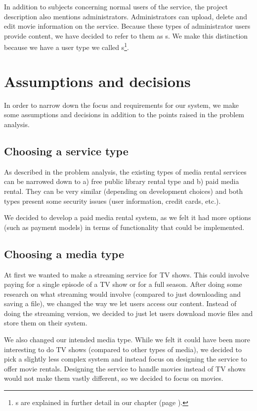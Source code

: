In addition to subjects concerning normal users of the service, the project description also mentions administrators. Administrators can upload, delete and edit movie information on the service. Because these types of administrator users provide content, we have decided to refer to them as s. We make this distinction because we have a user type we called s\footnote{s are explained in further detail in our  chapter (page \pageref{Design}).}.
\section{Assumptions and decisions}
\label{Overview_assumptions}
In order to narrow down the focus and requirements for our system, we make some assumptions and decisions in addition to the points raised in the problem analysis. 
\subsection{Choosing a service type}
\label{Overview_assumptions_stype}
As described in the problem analysis, the existing types of media rental services can be narrowed down to a) free public library rental type and b) paid media rental. They can be very similar (depending on development choices) and both types present some security issues (user information, credit cards, etc.).

We decided to develop a paid media rental system, as we felt it had more options (such as payment models) in terms of functionality that could be implemented.
\subsection{Choosing a media type}
\label{Overview_assumptions_mtype}
At first we wanted to make a streaming service for TV shows. This could involve paying for a single episode of a TV show or for a full season. After doing some research on what streaming would involve (compared to just downloading and saving a file), we changed the way we let users access our content. Instead of doing the streaming version, we decided to just let users download movie files and store them on their system.

We also changed our intended media type. While we felt it could have been more interesting to do TV shows (compared to other types of media), we decided to pick a slightly less complex system and instead focus on designing the service to offer movie rentals. Designing the service to handle movies instead of TV shows would not make them vastly different, so we decided to focus on movies.
